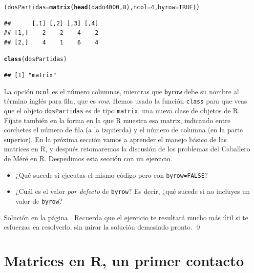 \documentclass[10pt,a4paper]{article}\usepackage[]{graphicx}\usepackage[]{color}
\makeatletter
\newcommand{\hlnum}[1]{\textcolor[rgb]{0.686,0.059,0.569}{#1}}%
\newcommand{\hlstd}[1]{\textcolor[rgb]{0.345,0.345,0.345}{#1}}%
\newcommand{\hlkwb}[1]{\textcolor[rgb]{0.69,0.353,0.396}{#1}}%
\newcommand{\hlkwc}[1]{\textcolor[rgb]{0.333,0.667,0.333}{#1}}%
\newcommand{\hlkwd}[1]{\textcolor[rgb]{0.737,0.353,0.396}{\textbf{#1}}}%
\newenvironment{kframe}{%
 \def\at@end@of@kframe{}%
 \ifinner\ifhmode%
  \def\at@end@of@kframe{\end{minipage}}%
  \begin{minipage}{\columnwidth}%
 \fi\fi%
 \def\FrameCommand##1{\hskip\@totalleftmargin \hskip-\fboxsep
 \colorbox{shadecolor}{##1}\hskip-\fboxsep
     \hskip-\linewidth \hskip-\@totalleftmargin \hskip\columnwidth}%
 \MakeFramed {\advance\hsize-\width
   \@totalleftmargin\z@ \linewidth\hsize
   \@setminipage}}%
 {\par\unskip\endMakeFramed%
 \at@end@of@kframe}
\newenvironment{knitrout}{}{} %
\newcounter {cont01}
\makeatother
\begin{document}
\begin{knitrout}
\color{fgcolor}\begin{kframe}
\begin{alltt}
\hlstd{(dosPartidas} \hlkwb{=} \hlkwd{matrix}\hlstd{(} \hlkwd{head}\hlstd{(dado4000,} \hlnum{8}\hlstd{),} \hlkwc{ncol}\hlstd{=}\hlnum{4}\hlstd{,} \hlkwc{byrow}\hlstd{=}\hlnum{TRUE}\hlstd{))}
\end{alltt}
\begin{verbatim}
##      [,1] [,2] [,3] [,4]
## [1,]    2    2    4    2
## [2,]    4    1    6    4
\end{verbatim}
\begin{alltt}
\hlkwd{class}\hlstd{(dosPartidas)}
\end{alltt}
\begin{verbatim}
## [1] "matrix"
\end{verbatim}
\end{kframe}
\end{knitrout}
La opción {\tt ncol} es el número columnas, mientras que {\tt byrow} debe su nombre al término inglés para fila, que es {\em row}.  Hemos usado la función {\tt class} para que veas que el objeto {\tt dosPartidas} es de tipo {\tt matrix}, una nueva clase de objetos de R. Fíjate también en la forma en la que R muestra esa matriz, indicando entre corchetes el número de fila (a la izquierda) y el número de columna (en la parte superior). En la próxima sección vamos a aprender el manejo básico de las matrices en R, y después retomaremos la discusión de los problemas del Caballero de Méré en R. Despedimos esta sección con un ejercicio.
\begin{ejercicio}
\label{tut03:ejercicio02}
\quad
\begin{itemize}
  \item ¿Qué sucede si ejecutas el mismo código pero con {\tt byrow=FALSE}?
  \item ¿Cuál es el valor {\em por defecto} de {\tt byrow}? Es decir, ¿qué sucede si no incluyes un valor de {\tt byrow}?
\end{itemize}
Solución en la página \pageref{tut03:ejercicio02:sol}. Recuerda que el ejercicio te resultará mucho más útil si te esfuerzas en resolverlo, sin mirar la solución demasiado pronto.
\qed
\end{ejercicio}


\section{Matrices en R, un primer contacto}
\label{tut03:subsec:MatricesR}
\end{document}
